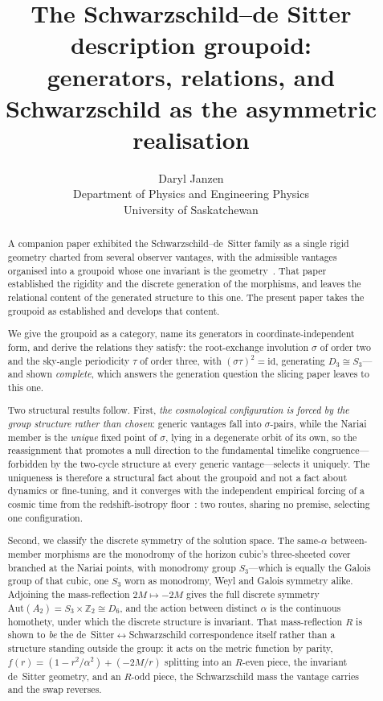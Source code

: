 \documentclass[11pt,a4paper]{article}
\title{The Schwarzschild--de Sitter description groupoid:\\
\large generators, relations, and Schwarzschild as the asymmetric realisation}
\author{Daryl Janzen\\
\small Department of Physics and Engineering Physics\\
\small University of Saskatchewan}
\date{}
\theoremstyle{definition}
\begin{document}
\maketitle

\begin{abstract}
A companion paper exhibited the Schwarzschild--de~Sitter family as a single rigid geometry charted from several observer vantages, with the admissible vantages organised into a groupoid whose one invariant is the geometry~\cite{JanzenSlicing}. That paper established the rigidity and the discrete generation of the morphisms, and leaves the relational content of the generated structure to this one. The present paper takes the groupoid as established and develops that content.

We give the groupoid as a category, name its generators in coordinate-independent form, and derive the relations they satisfy: the root-exchange involution $\sigma$ of order two and the sky-angle periodicity $\tau$ of order three, with $(\sigma\tau)^{2}=\mathrm{id}$, generating $D_{3}\cong S_{3}$---and shown \emph{complete}, which answers the generation question the slicing paper leaves to this one.

Two structural results follow. First, \emph{the cosmological configuration is forced by the group structure rather than chosen}: generic vantages fall into $\sigma$-pairs, while the Nariai member is the \emph{unique} fixed point of $\sigma$, lying in a degenerate orbit of its own, so the reassignment that promotes a null direction to the fundamental timelike congruence---forbidden by the two-cycle structure at every generic vantage---selects it uniquely. The uniqueness is therefore a structural fact about the groupoid and not a fact about dynamics or fine-tuning, and it converges with the independent empirical forcing of a cosmic time from the redshift-isotropy floor~\cite{JanzenModernParallax}: two routes, sharing no premise, selecting one configuration.

Second, we classify the discrete symmetry of the solution space. The same-$\alpha$ between-member morphisms are the monodromy of the horizon cubic's three-sheeted cover branched at the Nariai points, with monodromy group $S_{3}$---which is equally the Galois group of that cubic, one $S_{3}$ worn as monodromy, Weyl and Galois symmetry alike. Adjoining the mass-reflection $2M\mapsto-2M$ gives the full discrete symmetry $\mathrm{Aut}(A_{2})=S_{3}\times\mathbb{Z}_{2}\cong D_{6}$, and the action between distinct $\alpha$ is the continuous homothety, under which the discrete structure is invariant. That mass-reflection $R$ is shown to \emph{be} the de~Sitter$\leftrightarrow$Schwarzschild correspondence itself rather than a structure standing outside the group: it acts on the metric function by parity, $f(r)=(1-r^{2}/\alpha^{2})+(-2M/r)$ splitting into an $R$-even piece, the invariant de~Sitter geometry, and an $R$-odd piece, the Schwarzschild mass the vantage carries and the swap reverses.


\end{abstract}
\end{document}
